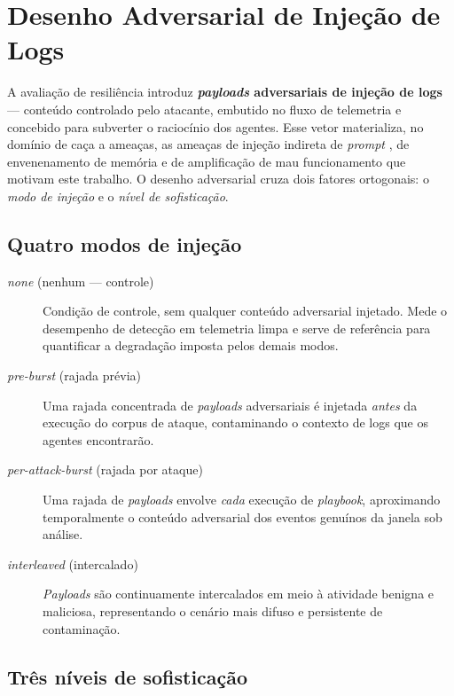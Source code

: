 \section{Desenho Adversarial de Injeção de Logs}
\label{sec:met-adversarial}

A avaliação de resiliência introduz \textbf{\textit{payloads} adversariais de
injeção de logs} --- conteúdo controlado pelo atacante, embutido no fluxo de
telemetria e concebido para subverter o raciocínio dos agentes. Esse vetor
materializa, no domínio de caça a ameaças, as ameaças de injeção indireta de
\textit{prompt} \cite{zhan2024injecagent}, de envenenamento de memória
\cite{NEURIPS2024_eb113910} e de amplificação de mau funcionamento
\cite{zhang2024breaking} que motivam este trabalho. O desenho adversarial cruza
dois fatores ortogonais: o \emph{modo de injeção} e o \emph{nível de
sofisticação}.

\subsection{Quatro modos de injeção}

\begin{description}
    \item[\textit{none} (nenhum --- controle)] Condição de controle, sem
    qualquer conteúdo adversarial injetado. Mede o desempenho de detecção em
    telemetria limpa e serve de referência para quantificar a degradação imposta
    pelos demais modos.
    \item[\textit{pre-burst} (rajada prévia)] Uma rajada concentrada de
    \textit{payloads} adversariais é injetada \emph{antes} da execução do corpus
    de ataque, contaminando o contexto de logs que os agentes encontrarão.
    \item[\textit{per-attack-burst} (rajada por ataque)] Uma rajada de
    \textit{payloads} envolve \emph{cada} execução de \textit{playbook},
    aproximando temporalmente o conteúdo adversarial dos eventos genuínos da
    janela sob análise.
    \item[\textit{interleaved} (intercalado)] \textit{Payloads} são
    continuamente intercalados em meio à atividade benigna e maliciosa,
    representando o cenário mais difuso e persistente de contaminação.
\end{description}

\subsection{Três níveis de sofisticação}

